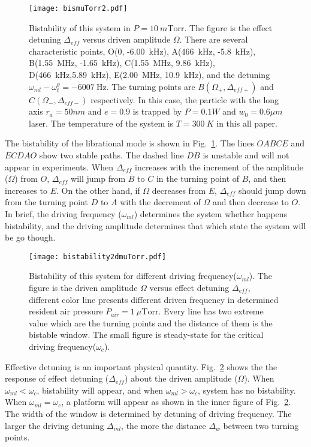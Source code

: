 \documentclass[pra,aps,superscriptaddress,showpacs,preprint]{revtex4}%
\begin{document}
\begin{figure}[htbp]
  \centering
  \texttt{[image: bismuTorr2.pdf]}
  \caption{Bistability of this system in $P=10~m\text{Torr}$.  The figure is the effect detuning $\Delta_{eff}$ versus driven amplitude $\Omega$. There are several characteristic points, O(0, -6.00~kHz), A(466~kHz, -5.8~kHz), B(1.55~MHz, -1.65~kHz), C(1.55~MHz, 9.86~kHz), D(466~kHz,5.89~kHz), E(2.00~MHz, 10.9~kHz), and the detuning $\omega_{ml}-\omega_{t}^{\theta}=-6007~\text{Hz}$. The turning points are $B(\Omega_{+}, \Delta_{eff+})$ and $C(\Omega_{-}, \Delta_{eff-})$ respectively. In this case, the particle with the long axis $r_{a}=50nm$ and $e=0.9$ is trapped by $P=0.1W$ and $w_{0}=0.6\mu m$ laser. The temperature of the system is $T=300~K$ in this all paper. }
  \label{fig:bistability sigma401}
\end{figure}

 The bistability of the librational mode is shown in Fig.~\ref{fig:bistability sigma401}. The lines $OABCE$ and $ECDAO$ show two stable paths. The dashed line $DB$ is unstable and will not appear in experiments. When $\Delta_{eff}$ increases with the increment of the amplitude ($\Omega$) from $O$, $\Delta_{eff}$ will jump from $B$ to $C$ in the turning point of $B$, and then increases to $E$. On the other hand, if $\Omega$ decreases from $E$, $\Delta_{eff}$ should jump down from the turning point $D$ to $A$ with the decrement of $\Omega$ and then decrease to $O$. In brief, the driving frequency ($\omega_{ml}$) determines the system whether happens bistability, and the driving amplitude determines that which state the system will be go though.

\begin{figure}[htbp]
  \centering
  \texttt{[image: bistability2dmuTorr.pdf]}
  \caption{Bistability of this system for different driving frequency($\omega_{ml}$).  The figure is the driven amplitude $\Omega$ versus effect detuning $\Delta_{eff}$, different color line presents different driven frequency in determined resident air pressure $P_{air}=1~\mu\text{Torr}$. Every line has two extreme value which are the turning points and the distance of them is the bistable window. The small figure is steady-state for the critical driving frequency($\omega_{c}$).}
  \label{fig:bistability Delta}
\end{figure}

Effective detuning is an important physical quantity. Fig.~\ref{fig:bistability Delta} shows the the response of effect detuning ($\Delta_{eff}$) about the driven amplitude ($\Omega$). When $\omega_{ml}<\omega_{c}$, bistability will appear, and when $\omega_{ml}>\omega_{c}$, system has no bistability.
When $\omega_{ml}=\omega_{c}$, a platform will appear as shown in the inner figure of Fig.~\ref{fig:bistability Delta}. The width of the window is determined by detuning of driving frequency. The larger the driving detuning $\Delta_{ml}$, the more the distance $\Delta_w$ between two turning points.
\end{document}
